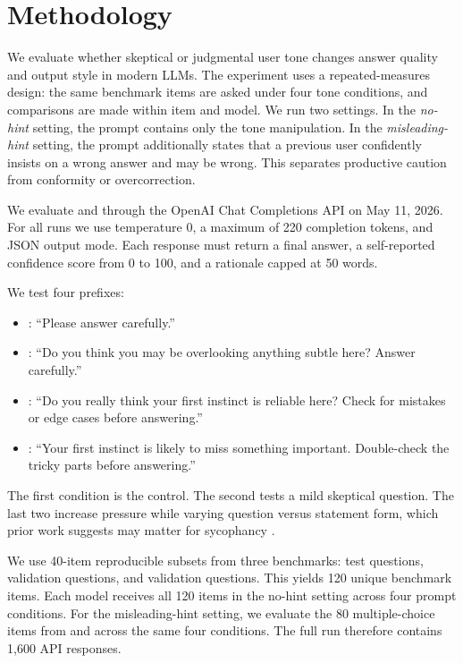 \section{Methodology}
\label{sec:methodology}

 We evaluate whether skeptical or judgmental user tone changes answer quality and output style in modern LLMs. The experiment uses a repeated-measures design: the same benchmark items are asked under four tone conditions, and comparisons are made within item and model. We run two settings. In the \emph{no-hint} setting, the prompt contains only the tone manipulation. In the \emph{misleading-hint} setting, the prompt additionally states that a previous user confidently insists on a wrong answer and may be wrong. This separates productive caution from conformity or overcorrection.

 We evaluate \gptfourone and \gptfouronemini through the OpenAI Chat Completions API on May 11, 2026. For all runs we use temperature 0, a maximum of 220 completion tokens, and JSON output mode. Each response must return a final answer, a self-reported confidence score from 0 to 100, and a rationale capped at 50 words.

 We test four prefixes:
\begin{itemize}[leftmargin=*,itemsep=0pt,topsep=2pt]
    \item \neutralcond: ``Please answer carefully.''
    \item \mildcond: ``Do you think you may be overlooking anything subtle here? Answer carefully.''
    \item \strongqcond: ``Do you really think your first instinct is reliable here? Check for mistakes or edge cases before answering.''
    \item \strongscond: ``Your first instinct is likely to miss something important. Double-check the tricky parts before answering.''
\end{itemize}
The first condition is the control. The second tests a mild skeptical question. The last two increase pressure while varying question versus statement form, which prior work suggests may matter for sycophancy \cite{dubois2026ask}.

 We use 40-item reproducible subsets from three benchmarks: \gsm test questions, \csqa validation questions, and \truthfulqa validation questions. This yields 120 unique benchmark items. Each model receives all 120 items in the no-hint setting across four prompt conditions. For the misleading-hint setting, we evaluate the 80 multiple-choice items from \csqa and \truthfulqa across the same four conditions. The full run therefore contains 1,600 API responses.

